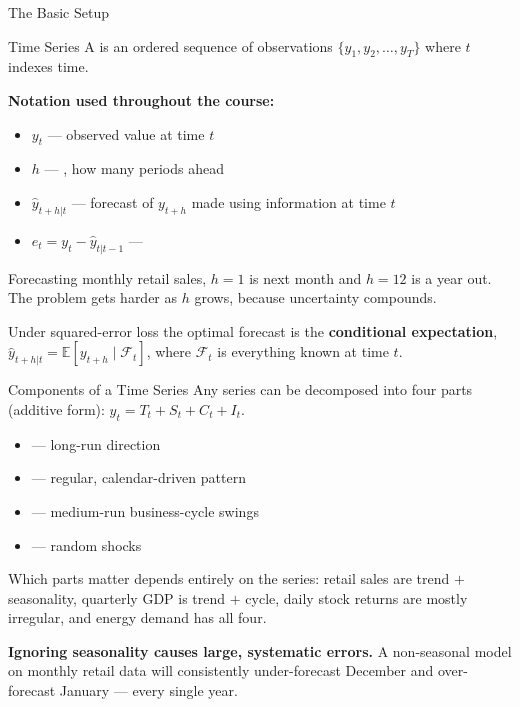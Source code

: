 \documentclass[aspectratio=169, 11pt]{beamer}
\begin{document}
\begin{frame}{The Basic Setup}
  \begin{definitionbox}{Time Series}
    A  is an ordered sequence of observations
    $\{y_1, y_2, \ldots, y_T\}$ where $t$ indexes time.
  \end{definitionbox}
  \textbf{Notation used throughout the course:}
  \begin{itemize}\small\itemsep1pt
    \item $y_t$ --- observed value at time $t$
    \item $h$ --- , how many periods ahead
    \item $\hat{y}_{t+h|t}$ --- forecast of $y_{t+h}$ made using information at time $t$
    \item $e_t = y_t - \hat{y}_{t|t-1}$ --- 
  \end{itemize}
  Forecasting monthly retail sales, $h=1$ is next month and $h=12$ is a year out.
  The problem gets harder as $h$ grows, because uncertainty compounds.

  \vspace{0.15cm}
  Under squared-error loss the optimal forecast is the \textbf{conditional
  expectation}, $\hat{y}_{t+h|t} = \mathbb{E}[y_{t+h} \mid \mathcal{F}_t]$,
  where $\mathcal{F}_t$ is everything known at time $t$.
\end{frame}

\begin{frame}{Components of a Time Series}
  Any series can be decomposed into four parts (additive form):
  $y_t = T_t + S_t + C_t + I_t$.
  \begin{itemize}\small\itemsep1pt
    \item {} --- long-run direction
    \item {} --- regular, calendar-driven pattern
    \item {} --- medium-run business-cycle swings
    \item {} --- random shocks
  \end{itemize}
  Which parts matter depends entirely on the series: retail sales are
  trend $+$ seasonality, quarterly GDP is trend $+$ cycle, daily stock returns
  are mostly irregular, and energy demand has all four.
  \begin{warningbox}
    \textbf{Ignoring seasonality causes large, systematic errors.}
    A non-seasonal model on monthly retail data will consistently
    under-forecast December and over-forecast January --- every single year.
  \end{warningbox}
\end{frame}
\end{document}

